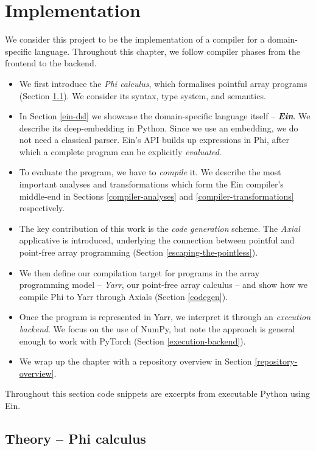 \chapter{Implementation}

We consider this project to be the implementation of a compiler for a domain-specific language. Throughout this chapter, we follow compiler phases from the frontend to the backend. 
\begin{itemize}
    \item We first introduce the \textit{Phi calculus}, which formalises pointful array programs (Section \ref{phi-calculus}). We consider its syntax, type system, and semantics.
    \item In Section \ref{ein-dsl} we showcase the domain-specific language itself -- \textit{\textbf{Ein}}. We describe its deep-embedding in Python. Since we use an embedding, we do not need a classical parser. Ein's API builds up expressions in Phi, after which a complete program can be explicitly \textit{evaluated}.
    \item To evaluate the program, we have to \textit{compile} it. We describe the most important analyses and transformations which form the Ein compiler's middle-end in Sections \ref{compiler-analyses} and \ref{compiler-transformations} respectively.
    \item The key contribution of this work is the \textit{code generation} scheme. The \textit{Axial} applicative is introduced, underlying the connection between pointful and point-free array programming (Section \ref{escaping-the-pointless}). 
    \item We then define our compilation target for programs in the array programming model -- \textit{Yarr}, our point-free array calculus -- and show how we compile Phi to Yarr through Axials (Section \ref{codegen}). 
    \item Once the program is represented in Yarr, we interpret it through an \textit{execution backend}. We focus on the use of NumPy, but note the approach is general enough to work with PyTorch (Section \ref{execution-backend}).
    \item We wrap up the chapter with a repository overview in Section \ref{repository-overview}.
\end{itemize}
Throughout this section code snippets are excerpts from executable Python using Ein. 


\newpage
\section{Theory -- Phi calculus}
\label{phi-calculus}

